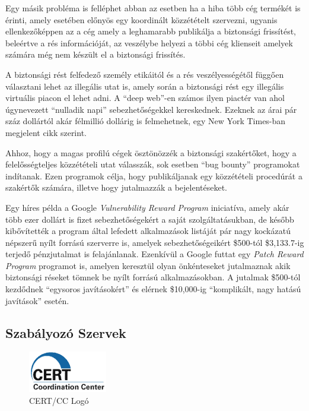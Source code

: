 \documentclass[a4paper,12pt]{article}
\begin{document}
	Egy másik probléma is felléphet abban az esetben ha a hiba több cég termékét is érinti, amely esetében előnyös egy koordinált közzétételt szervezni, ugyanis ellenkezőképpen az a cég amely a leghamarabb publikálja a biztonsági frissítést, beleértve a rés információját, az veszélybe helyezi a többi cég klienseit amelyek számára még nem készült el a biztonsági frissítés.
	
	A biztonsági rést felfedező személy etikáitól és a rés veszélyességétől függően választani lehet az illegális utat is, amely során a biztonsági rést egy illegális virtuális piacon el lehet adni. A ``deep web''-en számos ilyen piactér van ahol úgynevezett ``nulladik napi'' sebezhetőségekkel kereskednek. Ezeknek az árai pár száz dollártól akár félmillió dollárig is felmehetnek, egy New York Times-ban megjelent cikk szerint\cite{nperlroth13}.
	
	Ahhoz, hogy a magas profilú cégek ösztönözzék a biztonsági szakértőket, hogy a felelősségteljes közzétételi utat válasszák, sok esetben ``bug bounty'' programokat indítanak. Ezen programok célja, hogy publikáljanak egy közzétételi procedúrát a szakértők számára, illetve hogy jutalmazzák a bejelentéseket.
	
	Egy híres példa a Google \textit{Vulnerability Reward Program}\cite{googlevrp15} iniciatíva, amely akár több ezer dollárt is fizet sebezhetőségekért a saját szolgáltatásukban, de később kibővítették a program által lefedett alkalmazások listáját pár nagy kockázatú népszerű nyílt forrású szerverre is, amelyek sebezhetőségeikért \$500-tól \$3,133.7-ig terjedő pénzjutalmat is felajánlanak. Ezenkívül a Google futtat egy \textit{Patch Reward Program} programot is, amelyen keresztül olyan önkénteseket jutalmaznak akik biztonsági réseket tömnek be nyílt forrású alkalmazásokban. A jutalmak \$500-tól kezdődnek ``egysoros javításokért'' és elérnek \$10,000-ig ``komplikált, nagy hatású javítások'' esetén.
	
\subsection{Szabályozó Szervek}
	
	\begin{figure}
		\vspace{-10pt}
		\centering
		\includegraphics[scale=0.75]{cert.png}
		\caption{CERT/CC Logó}
	\end{figure}
	
\end{document}
